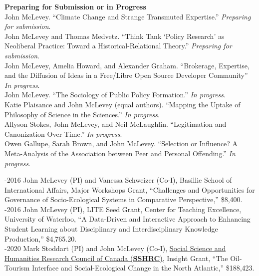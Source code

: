 \documentclass[9pt,usenames,dvipsnames]{article}
\begin{document}
\ind \textbf{Preparing for Submission or in Progress} \\

\ind John McLevey. ``Climate Change and Strange Transmuted Expertise.'' \emph{Preparing for submission}. \\

\ind John McLevey and Thomas Medvetz. ``Think Tank ‘Policy Research' as Neoliberal Practice: Toward a Historical-Relational Theory.'' \emph{Preparing for submission}. \\

\ind John McLevey, Amelia Howard, and Alexander Graham. ``Brokerage, Expertise, and the Diffusion of Ideas in a Free/Libre Open Source Developer Community'' \emph{In progress}.\\

\ind John McLevey. ``The Sociology of Public Policy Formation.'' \emph{In progress}. \\

\ind Katie Plaisance and John McLevey (equal authors). ``Mapping the Uptake of Philosophy of Science in the Sciences.'' \emph{In progress}.\\

\ind Allyson Stokes, John McLevey, and Neil McLaughlin. ``Legitimation and Canonization Over Time.'' \emph{In progress}.\\

\ind Owen Gallupe, Sarah Brown, and John McLevey. ``Selection or Influence? A Meta-Analysis of the Association between Peer and Personal Offending.'' \emph{In progress}. \\

\smallskip
{}

-2016 John McLevey (PI) and Vanessa Schweizer (Co-I), Basillie School of International Affairs, Major Workshops Grant, ``Challenges and Opportunities for Governance of Socio-Ecological Systems in Comparative Perspective,'' \$8,400. \\

-2016 John McLevey (PI), LITE Seed Grant, Center for Teaching Excellence, University of Waterloo, ``A Data-Driven and Interactive Approach to Enhancing Student Learning about Disciplinary and Interdisciplinary Knowledge Production,'' \$4,765.20. \\

-2020 Mark Stoddart (PI) and John McLevey (Co-I), \href{http://www.sshrc-crsh.gc.ca/funding-financement/programs-programmes/insight_development_grants-su
bventions_de_developpement_savoir-eng.aspx}{Social Science and Humanities Research Council of Canada (\textbf{SSHRC})}, Insight Grant, ``The Oil-Tourism Interface and Social-Ecological Change in the North Atlantic,'' \$188,423. \\
\end{document}
